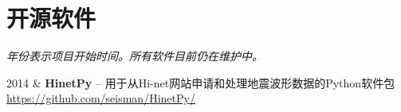 \section{开源软件}

\emph{年份表示项目开始时间。所有软件目前仍在维护中。}

\begin{EntriesTable}{0.05}{0.02}{0.93}
2014 & \textbf{HinetPy} -- 用于从Hi-net网站申请和处理地震波形数据的Python软件包 \newline
       \url{https://github.com/seisman/HinetPy/} \\
\end{EntriesTable}

